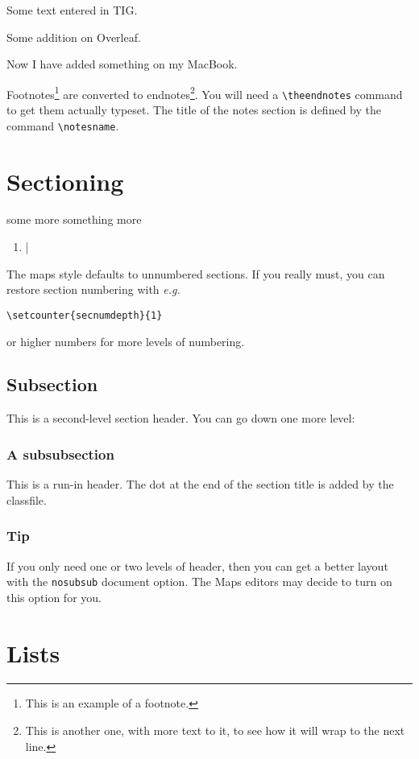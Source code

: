 \documentclass[nosubsub]{maps}
\renewcommand{\notesname}{Footnotes}
\begin{document}
Some text entered in TIG.

Some addition on Overleaf.

Now I have added something on my MacBook.

\newpage
Footnotes\footnote{This is an example of a footnote.}  are converted
to endnotes\footnote{This is another one, with more text to it, to
see how it will wrap to the next line.}. You will need a
\verb+\theendnotes+ command to get them actually typeset. The title
of the notes section is defined by the command \verb+\notesname+.

\section{Sectioning}

some more
something more
\begin{enumerate}
    \item |
\end{enumerate}

The maps style defaults to unnumbered sections. If you really must,
you can restore section numbering with \emph{e.g.}
\begin{verbatim}
\setcounter{secnumdepth}{1}
\end{verbatim}
or higher numbers for more levels of numbering.

\subsection{Subsection}
This is a second-level section header. You can go down one more
level:

\subsubsection{A subsubsection}

This is a run-in header. The dot at the end of the section title is
added by the classfile.

\subsubsection{Tip}
If you only need one or two levels of header, then you can get a
better layout with the \texttt{nosubsub} document option.
The Maps editors may decide to turn on this option for you.

\section{Lists}
\end{document}
